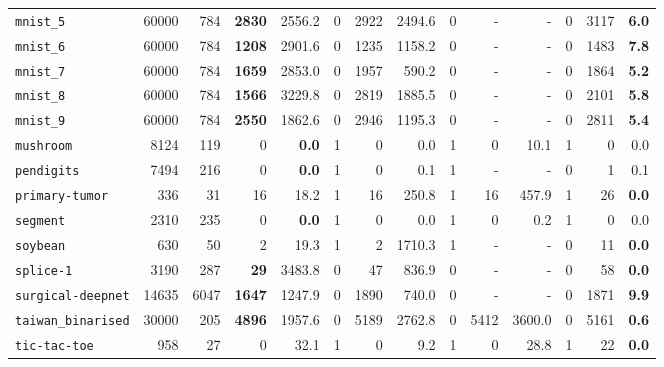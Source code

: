 \begin{tabular}{lccrrrrrrrrrrr}
\texttt{mnist\_5} & \multicolumn{1}{r}{60000} & \multicolumn{1}{r}{784}  & \textbf{2830} & 2556.2 & 0 & 2922 & 2494.6 & 0 & - & - & 0 & 3117 & \textbf{6.0}\\
\texttt{mnist\_6} & \multicolumn{1}{r}{60000} & \multicolumn{1}{r}{784}  & \textbf{1208} & 2901.6 & 0 & 1235 & 1158.2 & 0 & - & - & 0 & 1483 & \textbf{7.8}\\
\texttt{mnist\_7} & \multicolumn{1}{r}{60000} & \multicolumn{1}{r}{784}  & \textbf{1659} & 2853.0 & 0 & 1957 & 590.2 & 0 & - & - & 0 & 1864 & \textbf{5.2}\\
\texttt{mnist\_8} & \multicolumn{1}{r}{60000} & \multicolumn{1}{r}{784}  & \textbf{1566} & 3229.8 & 0 & 2819 & 1885.5 & 0 & - & - & 0 & 2101 & \textbf{5.8}\\
\texttt{mnist\_9} & \multicolumn{1}{r}{60000} & \multicolumn{1}{r}{784}  & \textbf{2550} & 1862.6 & 0 & 2946 & 1195.3 & 0 & - & - & 0 & 2811 & \textbf{5.4}\\
\texttt{mushroom} & \multicolumn{1}{r}{8124} & \multicolumn{1}{r}{119}  & 0 & \textbf{0.0} & 1 & 0 & 0.0 & 1 & 0 & 10.1 & 1 & 0 & 0.0\\
\texttt{pendigits} & \multicolumn{1}{r}{7494} & \multicolumn{1}{r}{216}  & 0 & \textbf{0.0} & 1 & 0 & 0.1 & 1 & - & - & 0 & 1 & 0.1\\
\texttt{primary-tumor} & \multicolumn{1}{r}{336} & \multicolumn{1}{r}{31}  & 16 & 18.2 & 1 & 16 & 250.8 & 1 & 16 & 457.9 & 1 & 26 & \textbf{0.0}\\
\texttt{segment} & \multicolumn{1}{r}{2310} & \multicolumn{1}{r}{235}  & 0 & \textbf{0.0} & 1 & 0 & 0.0 & 1 & 0 & 0.2 & 1 & 0 & 0.0\\
\texttt{soybean} & \multicolumn{1}{r}{630} & \multicolumn{1}{r}{50}  & 2 & 19.3 & 1 & 2 & 1710.3 & 1 & - & - & 0 & 11 & \textbf{0.0}\\
\texttt{splice-1} & \multicolumn{1}{r}{3190} & \multicolumn{1}{r}{287}  & \textbf{29} & 3483.8 & 0 & 47 & 836.9 & 0 & - & - & 0 & 58 & \textbf{0.0}\\
\texttt{surgical-deepnet} & \multicolumn{1}{r}{14635} & \multicolumn{1}{r}{6047}  & \textbf{1647} & 1247.9 & 0 & 1890 & 740.0 & 0 & - & - & 0 & 1871 & \textbf{9.9}\\
\texttt{taiwan\_binarised} & \multicolumn{1}{r}{30000} & \multicolumn{1}{r}{205}  & \textbf{4896} & 1957.6 & 0 & 5189 & 2762.8 & 0 & 5412 & 3600.0 & 0 & 5161 & \textbf{0.6}\\
\texttt{tic-tac-toe} & \multicolumn{1}{r}{958} & \multicolumn{1}{r}{27}  & 0 & 32.1 & 1 & 0 & 9.2 & 1 & 0 & 28.8 & 1 & 22 & \textbf{0.0}\\

\end{tabular}
